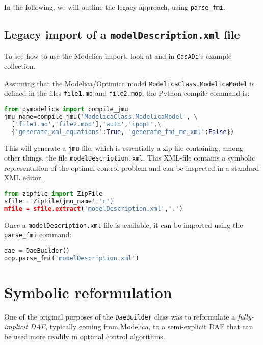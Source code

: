 \documentclass[a4paper,12pt]{book}
\newcommand{\CasADi}{\texttt{CasADi}\xspace}
\newcommand{\python}[1]{\lstinline[language=Python]{#1}}
\begin{document}
In the following, we will outline the legacy approach, using
\python{parse_fmi}.

\subsection*{Legacy import of a \texttt{modelDescription.xml} file}
To see how to use the Modelica import, look at  and  in \CasADi's example collection.

Assuming that the Modelica/Optimica model \texttt{ModelicaClass.ModelicaModel} is defined in the files \texttt{file1.mo} and \texttt{file2.mop}, the Python compile command is:
\begin{lstlisting}[language=Python]
from pymodelica import compile_jmu
jmu_name=compile_jmu('ModelicaClass.ModelicaModel', \
  ['file1.mo','file2.mop'],'auto','ipopt',\
  {'generate_xml_equations':True, 'generate_fmi_me_xml':False})
\end{lstlisting}

This will generate a \texttt{jmu}-file, which is essentially a zip file containing, among other things, the file \texttt{modelDescription.xml}. This XML-file contains a symbolic representation of the optimal control problem and can be inspected in a standard XML editor.
\begin{lstlisting}[language=Python]
from zipfile import ZipFile
sfile = ZipFile(jmu_name','r')
mfile = sfile.extract('modelDescription.xml','.')
\end{lstlisting}

Once a \texttt{modelDescription.xml} file is available, it can be imported
using the \python{parse_fmi} command:

\begin{lstlisting}[language=Python]
dae = DaeBuilder()
ocp.parse_fmi('modelDescription.xml')
\end{lstlisting}

\section{Symbolic reformulation}
One of the original purposes of the \texttt{DaeBuilder} class was to reformulate
a \emph{fully-implicit DAE}, typically coming from Modelica, to a semi-explicit
DAE that can be used more readily in optimal control algorithms.
\end{document}
